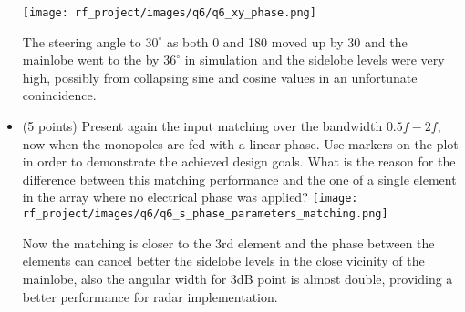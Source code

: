 \documentclass[12pt, letterpaper]{article}
\begin{document}
\begin{itemize}
  \texttt{[image: rf\_project/images/q6/q6\_xy\_phase.png]}

  {\color{blue}The steering angle to $30^{\circ}$ as both 0 and 180 moved up by 30 and the mainlobe went to the by $36^{\circ}$ in simulation and the sidelobe levels were very high, possibly from collapsing sine and cosine values in an unfortunate conincidence.}
  \item (5 points) Present again the input matching over the bandwidth $0.5f - 2f$, now when the monopoles are fed with a linear phase. Use markers on the plot in order to demonstrate the achieved design goals. What is the reason for the difference between this matching performance and the one of a single element in the array where no electrical phase was applied?
  \texttt{[image: rf\_project/images/q6/q6\_s\_phase\_parameters\_matching.png]}

  {\color{blue} Now the matching is closer to the 3rd element and the phase between the elements can cancel better the sidelobe levels in the close vicinity of the mainlobe, also the angular width for 3dB point is almost double, providing a better performance for radar implementation.}
\end{itemize}
\end{document}
